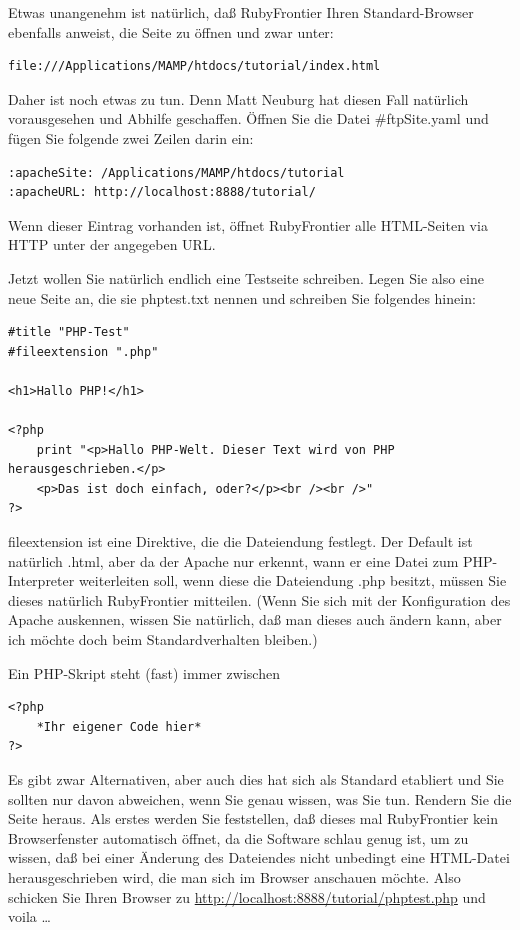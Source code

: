 \documentclass[11pt]{report}
\begin{document}
Etwas unangenehm ist natürlich, daß RubyFrontier Ihren
Standard-Browser ebenfalls anweist, die Seite zu öffnen und zwar
unter:


\begin{verbatim}
file:///Applications/MAMP/htdocs/tutorial/index.html
\end{verbatim}

Daher ist noch etwas zu tun. Denn Matt Neuburg hat diesen Fall
natürlich vorausgesehen und Abhilfe geschaffen. Öffnen Sie die
Datei \#ftpSite.yaml und fügen Sie folgende zwei Zeilen darin ein:


\begin{verbatim}
:apacheSite: /Applications/MAMP/htdocs/tutorial
:apacheURL: http://localhost:8888/tutorial/
\end{verbatim}

Wenn dieser Eintrag vorhanden ist, öffnet RubyFrontier alle
HTML-Seiten via HTTP unter der angegeben URL.


Jetzt wollen Sie natürlich endlich eine Testseite schreiben. Legen Sie
also eine neue Seite an, die sie phptest.txt nennen und schreiben Sie
folgendes hinein:


\begin{verbatim}
#title "PHP-Test"
#fileextension ".php"

<h1>Hallo PHP!</h1>

<?php
    print "<p>Hallo PHP-Welt. Dieser Text wird von PHP herausgeschrieben.</p>
    <p>Das ist doch einfach, oder?</p><br /><br />"
?>
\end{verbatim}

fileextension ist eine Direktive, die die Dateiendung festlegt. Der
Default ist natürlich .html, aber da der Apache nur erkennt, wann er
eine Datei zum PHP-Interpreter weiterleiten soll, wenn diese die
Dateiendung .php besitzt, müssen Sie dieses natürlich RubyFrontier
mitteilen. (Wenn Sie sich mit der Konfiguration des Apache auskennen,
wissen Sie natürlich, daß man dieses auch ändern kann, aber ich möchte
doch beim Standardverhalten bleiben.)


Ein PHP-Skript steht (fast) immer zwischen


\begin{verbatim}
<?php
    *Ihr eigener Code hier*
?>
\end{verbatim}

Es gibt zwar Alternativen, aber auch dies hat sich als Standard
etabliert und Sie sollten nur davon abweichen, wenn Sie genau wissen,
was Sie tun. Rendern Sie die Seite heraus. Als erstes werden Sie
feststellen, daß dieses mal RubyFrontier kein Browserfenster
automatisch öffnet, da die Software schlau genug ist, um zu wissen,
daß bei einer Änderung des Dateiendes nicht unbedingt eine HTML-Datei
herausgeschrieben wird, die man sich im Browser anschauen möchte. Also
schicken Sie Ihren Browser zu
\href{http://localhost:8888/tutorial/phptest.php}{http://localhost:8888/tutorial/phptest.php} und voila …
\end{document}
